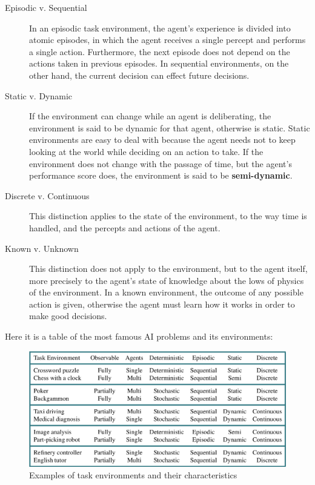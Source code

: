 \documentclass{article}
\begin{document}
\begin{description}
    \item[Episodic v. Sequential] In an episodic task environment, the agent's experience is divided into atomic episodes, in which the agent receives a single percept and performs a single action. Furthermore, the next episode does not depend on the actions taken in previous episodes. In sequential environments, on the other hand, the current decision can effect future decisions.

    \item[Static v. Dynamic] If the environment can change while an agent is deliberating, the environment is said to be dynamic for that agent, otherwise is static. Static environments are easy to deal with because the agent needs not to keep looking at the world while deciding on an action to take. If the environment does not change with the passage of time, but the agent's performance score does, the environment is said to be \textbf{semi-dynamic}.

    \item[Discrete v. Continuous] This distinction applies to the state of the environment, to the way time is handled, and the percepts and actions of the agent.

    \item[Known v. Unknown] This distinction does not apply to the environment, but to the agent itself, more precisely to the agent's state of knowledge about the lows of physics of the environment. In a known environment, the outcome of any possible action is given, otherwise the agent must learn how it works in order to make good decisions.
\end{description}

\noindent
Here it is a table of the most famous AI problems and its environments:
\begin{figure}[h]
    \centering
    \includegraphics[width=0.85\linewidth]{images/Task Environments.png}
    \caption{Examples of task environments and their characteristics}
    \label{fig:task_nvironments}
\end{figure}
\end{document}
